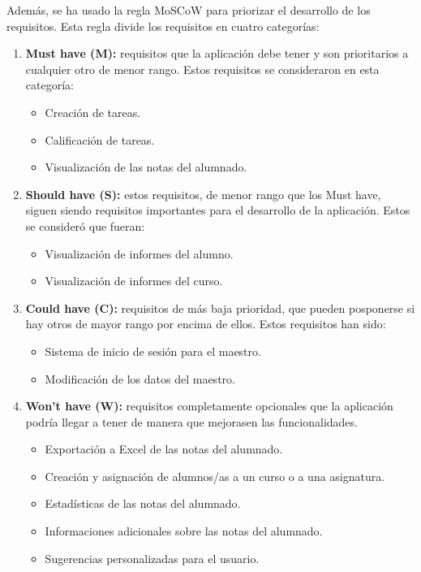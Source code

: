 Además, se ha usado la regla MoSCoW para priorizar el desarrollo de los requisitos. Esta regla divide los requisitos en cuatro categorías:
\begin{enumerate}
	\item \textbf{Must have (M):} requisitos que la aplicación debe tener y son prioritarios a cualquier otro de menor rango. Estos requisitos se consideraron en esta categoría:
	\begin{itemize}
		\item Creación de tareas.
		\item Calificación de tareas.
		\item Visualización de las notas del alumnado.
	\end{itemize}
	
	
	\item \textbf{Should have (S):} estos requisitos, de menor rango que los Must have, siguen siendo requisitos importantes para el desarrollo de la aplicación. Estos se consideró que fueran:
	\begin{itemize}
		\item Visualización de informes del alumno.
		\item Visualización de informes del curso.
	\end{itemize}
	
	
	\item \textbf{Could have (C):} requisitos de más baja prioridad, que pueden posponerse si hay otros de mayor rango por encima de ellos.  Estos requisitos han sido:
	\begin{itemize}
		\item Sistema de inicio de sesión para el maestro.
		\item Modificación de los datos del maestro.
	\end{itemize}
	
	
	\item \textbf{Won't have (W):} requisitos completamente opcionales que la aplicación podría llegar a tener de manera que mejorasen las funcionalidades.
	\begin{itemize}
		\item Exportación a Excel de las notas del alumnado.
		\item Creación y asignación de alumnos/as a un curso o a una asignatura.
		\item Estadísticas de las notas del alumnado.
		\item Informaciones adicionales sobre las notas del alumnado.
		\item Sugerencias personalizadas para el usuario.
	\end{itemize}
	
	
\end{enumerate}

